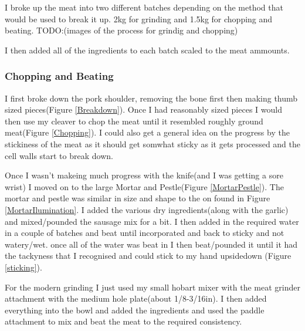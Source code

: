 \documentclass[letterpaper,11pt,leqno]{article}
\begin{document}
I broke up the meat into two different batches depending on the method that would be used to break it up. 2kg for grinding and 1.5kg for chopping and beating. TODO:(images of the process for grindig and chopping)

I then added all of the ingredients to each batch scaled to the meat ammounts.


\subsubsection{Chopping and Beating}

I first broke down the pork shoulder, removing the bone first then making thumb sized pieces(Figure \ref{Breakdown}). Once I had reasonably sized pieces I would then use my cleaver to chop the meat until it resembled roughly ground meat(Figure \ref{Chopping}). I could also get a general idea on the progress by the stickiness of the meat as it should get somwhat sticky as it gets processed and the cell walls start to break down. 

Once I wasn't makeing much progress with the knife(and I was getting a sore wrist) I moved on to the large Mortar and Pestle(Figure \ref{MortarPestle}). The mortar and pestle was similar in size and shape to the on found in Figure \ref{MortarIlumination}. I added the various dry ingredients(along with the garlic) and mixed/pounded the sausage mix for a bit. I then added in the required water in a couple of batches and beat until incorporated and back to sticky and not watery/wet. once all of the water was beat in I then beat/pounded it until it had the tackyness that I recognised and could stick to my hand upsidedown (Figure \ref{sticking}).

For the modern grinding I just used my small hobart mixer with the meat grinder attachment with the medium hole plate(about 1/8-3/16in). I then added everything into the bowl and added the ingredients and used the paddle attachment to mix and beat the meat to the required consistency.
\end{document}
